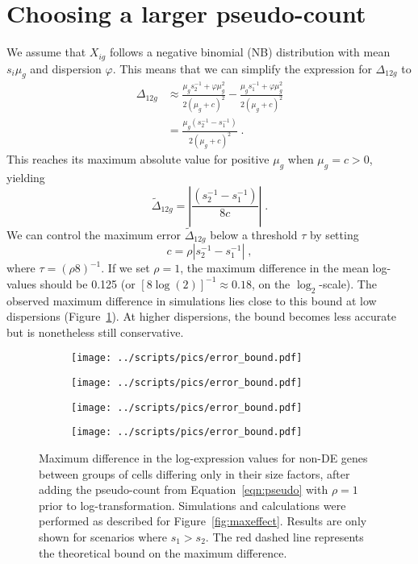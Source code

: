 \documentclass[10pt,letterpaper]{article}
\begin{document}
\section{Choosing a larger pseudo-count}
We assume that $X_{ig}$ follows a negative binomial (NB) distribution with mean $s_i\mu_g$ and dispersion $\varphi$.
This means that we can simplify the expression for $\Delta_{12g}$ to
\begin{align}
\Delta_{12g} 
&\approx \frac{\mu_g s_2^{-1} + \varphi \mu_g^2}{2(\mu_g + c)^2} - \frac{\mu_g s_1^{-1} + \varphi \mu_g^2}{2(\mu_g + c)^2} \nonumber \\
&= \frac{\mu_g (s_2^{-1} - s_1^{-1})}{2(\mu_g + c)^2} \;. \label{eqn:nberr}
\end{align}
This reaches its maximum absolute value for positive $\mu_g$ when $\mu_g = c > 0$, yielding 
\[
\tilde\Delta_{12g} = \left|\frac{(s_2^{-1} - s_1^{-1})}{8c}\right| \;.
\]
We can control the maximum error $\tilde\Delta_{12g}$ below a threshold $\tau$ by setting  
\begin{equation}
    c = \rho |s_2^{-1} - s_1^{-1}| \;, \label{eqn:pseudo} 
\end{equation}
where $\tau = (\rho 8)^{-1}$.
If we set $\rho = 1$, the maximum difference in the mean log-values should be 0.125 (or $[8\log(2)]^{-1} \approx 0.18$, on the $\log_2$-scale).
The observed maximum difference in simulations lies close to this bound at low dispersions (Figure~\ref{fig:cappederr}).
At higher dispersions, the bound becomes less accurate but is nonetheless still conservative.

\begin{figure}[btp]
\centering
\begin{subfigure}[b]{0.49\textwidth}
    \texttt{[image: ../scripts/pics/error\_bound.pdf]}
    \caption{}
\end{subfigure}
\begin{subfigure}[b]{0.49\textwidth}
    \texttt{[image: ../scripts/pics/error\_bound.pdf]}
    \caption{}
\end{subfigure}
\begin{subfigure}[b]{0.49\textwidth}
    \texttt{[image: ../scripts/pics/error\_bound.pdf]}
    \caption{}
\end{subfigure}
\begin{subfigure}[b]{0.49\textwidth}
    \texttt{[image: ../scripts/pics/error\_bound.pdf]}
    \caption{}
\end{subfigure}
\caption{Maximum difference in the log-expression values for non-DE genes between groups of cells differing only in their size factors, 
after adding the pseudo-count from Equation~\ref{eqn:pseudo} with $\rho=1$ prior to log-transformation.
Simulations and calculations were performed as described for Figure~\ref{fig:maxeffect}.
Results are only shown for scenarios where $s_1 > s_2$.
The red dashed line represents the theoretical bound on the maximum difference.
}
\label{fig:cappederr}
\end{figure}
\end{document}
